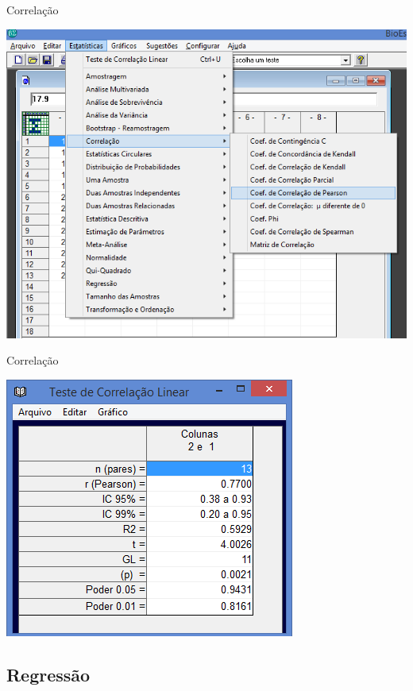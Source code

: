 \documentclass{beamer}
\begin{document}
\begin{frame}{Correlação}
  \begin{center}
    \includegraphics[height=0.9\textheight]{Pratica_Assoc/selecao_correlacao}
  \end{center}
\end{frame}

\begin{frame}{Correlação}
  \begin{center}
    \includegraphics[height=0.9\textheight]{Pratica_Assoc/resultado_correlacao}
  \end{center}
\end{frame}


\subsection{Regressão}
\end{document}

